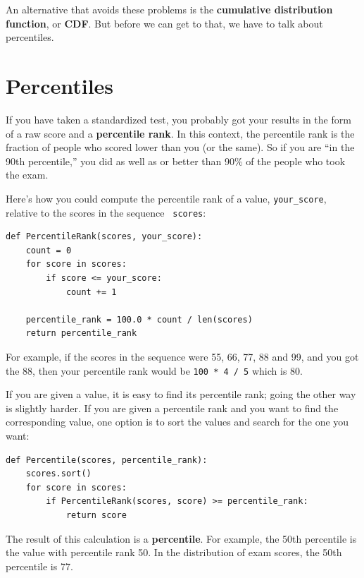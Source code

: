 \documentclass[12pt]{book}
\begin{document}
An alternative that avoids these problems is the {\bf cumulative
distribution function}, or {\bf CDF}.  But before we can get to that,
we have to talk about percentiles.



\section{Percentiles}

If you have taken a standardized test, you probably got your
results in the form of a raw score and a {\bf percentile rank}.
In this context, the percentile rank is the fraction of people who
scored lower than you (or the same).  So if you are ``in the 90th
percentile,'' you did as well as or better than 90\% of the people who
took the exam.

Here's how you could compute the percentile rank of a value,
\verb"your_score", relative to the scores in the sequence {\tt
  scores}:

\begin{verbatim}
def PercentileRank(scores, your_score):
    count = 0
    for score in scores:
        if score <= your_score:
            count += 1

    percentile_rank = 100.0 * count / len(scores)
    return percentile_rank
\end{verbatim}
%
%
For example, if the scores in the sequence were 55, 66, 77, 88 and 99,
and you got the 88, then your percentile rank would be {\tt 100 * 4 / 5}
which is 80.

If you are given a value, it is easy to find its percentile rank; going
the other way is slightly harder.  If you are given a percentile rank
and you want to find the corresponding value, one option is to
sort the values and search for the one you want:

\begin{verbatim}
def Percentile(scores, percentile_rank):
    scores.sort()
    for score in scores:
        if PercentileRank(scores, score) >= percentile_rank:
            return score
\end{verbatim}

The result of this calculation is a {\bf percentile}.  For example,
the 50th percentile is the value with percentile rank 50.  In the
distribution of exam scores, the 50th percentile is 77.

\end{document}
